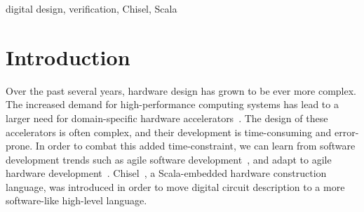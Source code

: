 \documentclass[conference]{IEEEtran}
\begin{document}
\begin{IEEEkeywords}
digital design, verification, Chisel, Scala
\end{IEEEkeywords}

%

\section{Introduction}
\label{sec:introduction}

Over the past several years, hardware design has grown to be ever more complex.
The increased demand for high-performance computing systems has lead to a larger need for domain-specific hardware accelerators~\cite{domain-hw-acc:2020}.
The design of these accelerators is often complex, and their development is time-consuming and error-prone.
In order to combat this added time-constraint, we can learn from software development trends such as agile software development~\cite{agile:manifesto}, and adapt to agile hardware development~\cite{henn-patt:turing:2019}.
Chisel~\cite{chisel:dac2012}, a Scala-embedded hardware construction language, was introduced in order to move digital circuit description to a more software-like high-level language. 
\end{document}
